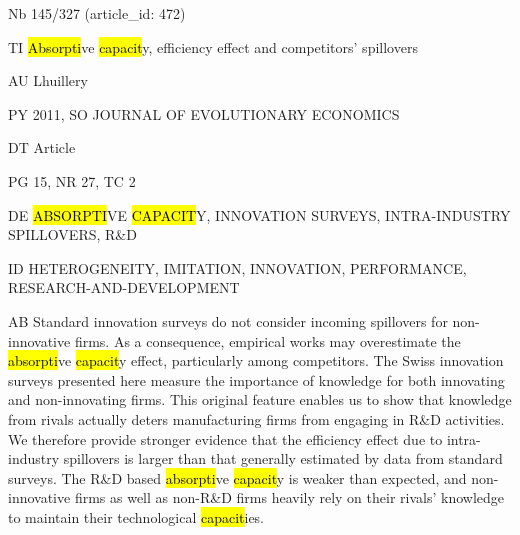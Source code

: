 \documentclass[a4paper]{article}
\begin{document}
\vspace*{-2cm}
Nb \tabto{0cm}145/327 (article\_id: 472)\par
TI \tabto{0cm}\hl{Absorpti}ve \hl{capacit}y, efficiency effect and competitors' spillovers\par
AU \tabto{0cm}Lhuillery\par
PY \tabto{0cm}2011, SO JOURNAL OF EVOLUTIONARY ECONOMICS\par
DT \tabto{0cm}Article\par
PG \tabto{0cm}15, NR 27, TC 2\par
DE \tabto{0cm}\hl{ABSORPTI}VE \hl{CAPACIT}Y, INNOVATION SURVEYS, INTRA-INDUSTRY SPILLOVERS, R\&D\par
ID \tabto{0cm}HETEROGENEITY, IMITATION, INNOVATION, PERFORMANCE, RESEARCH-AND-DEVELOPMENT\par
AB \tabto{0cm}Standard innovation surveys do not consider incoming spillovers for non-innovative firms. As a consequence, empirical works may overestimate the \hl{absorpti}ve \hl{capacit}y effect, particularly among competitors. The Swiss innovation surveys presented here measure the importance of knowledge for both innovating and non-innovating firms. This original feature enables us to show that knowledge from rivals actually deters manufacturing firms from engaging in R\&D activities. We therefore provide stronger evidence that the efficiency effect due to intra-industry spillovers is larger than that generally estimated by data from standard surveys. The R\&D based \hl{absorpti}ve \hl{capacit}y is weaker than expected, and non-innovative firms as well as non-R\&D firms heavily rely on their rivals' knowledge to maintain their technological \hl{capacit}ies.\par
\clearpage
\end{document}
